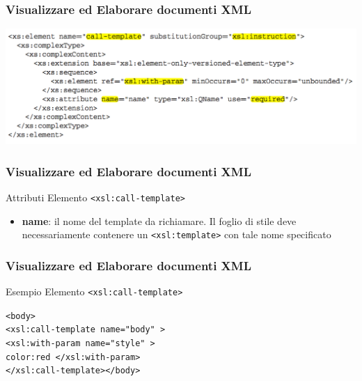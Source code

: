 \begin{frame}
    \frametitle{Visualizzare ed Elaborare documenti XML}
    \addtocounter{nframe}{1}
    
    \begin{center}
        \includegraphics[width=.95\textwidth]{imgs/Schema-call-template.png}
    \end{center}

\end{frame}

\begin{frame}
    \frametitle{Visualizzare ed Elaborare documenti XML}
    \addtocounter{nframe}{1}
    

     \begin{block}{Attributi Elemento \texttt{<xsl:call-template>}}
         \begin{itemize}
             \item \textbf{name}: il nome del template da richiamare. Il foglio di stile deve necessariamente contenere un \texttt{<xsl:template>} con tale nome specificato
        \end{itemize}
     \end{block}
    
\end{frame}

\begin{frame}
    \frametitle{Visualizzare ed Elaborare documenti XML}
    \addtocounter{nframe}{1}
    

     \begin{block}{Esempio Elemento \texttt{<xsl:call-template>}}
        
        \texttt{<body>}
        \\\texttt{<xsl:call-template name="body" >}
        \\\texttt{<xsl:with-param name="style" >}
        \\\texttt{color:red </xsl:with-param>}
        \\\texttt{</xsl:call-template></body>}

     \end{block}
\end{frame}


